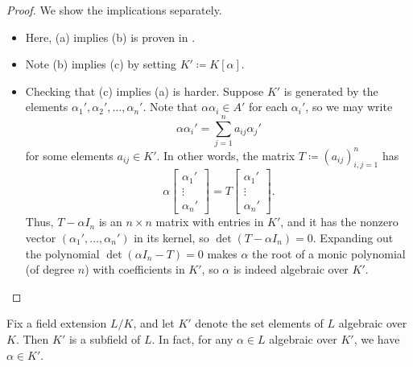 \documentclass[../notes.tex]{subfiles}
\begin{document}
\begin{proof}
	We show the implications separately.
	\begin{itemize}
		\item Here, (a) implies (b) is proven in .
		\item Note (b) implies (c) by setting $K'\coloneqq K[\alpha]$.
		\item Checking that (c) implies (a) is harder. Suppose $K'$ is generated by the elements $\alpha_1',\alpha_2',\ldots,\alpha_n'$. Note that $\alpha\alpha_i\in A'$ for each $\alpha_i'$, so we may write
		\[\alpha\alpha_i'=\sum_{j=1}^na_{ij}\alpha_j'\]
		for some elements $a_{ij}\in K'$. In other words, the matrix $T\coloneqq(a_{ij})_{i,j=1}^n$ has
		\[\alpha\begin{bmatrix}
			\alpha_1' \\
			\vdots \\
			\alpha_n'
		\end{bmatrix}=T\begin{bmatrix}
			\alpha_1' \\
			\vdots \\
			\alpha_n'
		\end{bmatrix}.\]
		Thus, $T-\alpha I_n$ is an $n\times n$ matrix with entries in $K'$, and it has the nonzero vector $(\alpha_1',\ldots,\alpha_n')$ in its kernel, so $\det(T-\alpha I_n)=0$. Expanding out the polynomial $\det(\alpha I_n-T)=0$ makes $\alpha$ the root of a monic polynomial (of degree $n$) with coefficients in $K'$, so $\alpha$ is indeed algebraic over $K'$.
		\qedhere
	\end{itemize}
\end{proof}
\begin{corollary} \label{cor:alg-elements-form-field}
	Fix a field extension $L/K$, and let $K'$ denote the set elements of $L$ algebraic over $K$. Then $K'$ is a subfield of $L$. In fact, for any $\alpha\in L$ algebraic over $K'$, we have $\alpha\in K'$.
\end{corollary}
\end{document}
